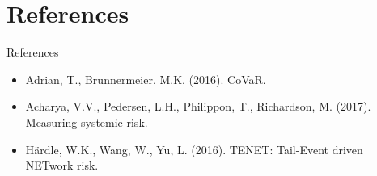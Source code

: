 \documentclass[9pt, aspectratio=169, t]{beamer}
\theoremstyle{definition}
\begin{document}
\section{References}

\begin{frame}{References}
    \begin{itemize}
        \item Adrian, T., Brunnermeier, M.K. (2016). CoVaR.
        \item Acharya, V.V., Pedersen, L.H., Philippon, T., Richardson, M. (2017). Measuring systemic risk.
        \item H\"ardle, W.K., Wang, W., Yu, L. (2016). TENET: Tail-Event driven NETwork risk.
    \end{itemize}
\end{frame}
\end{document}
